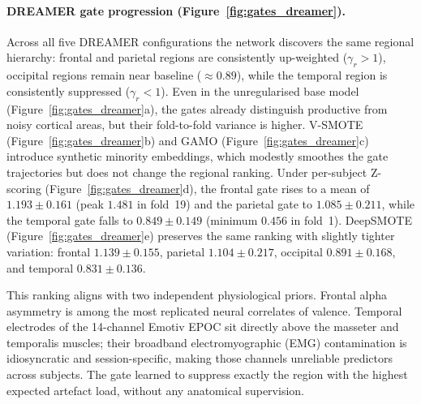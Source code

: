 \documentclass[a4paper,fleqn]{cas-sc}
\begin{document}
\paragraph{DREAMER gate progression (Figure~\ref{fig:gates_dreamer}).}
Across all five DREAMER configurations the network discovers the same regional hierarchy: frontal and parietal regions are consistently up-weighted ($\gamma_r > 1$), occipital regions remain near baseline ($\approx 0.89$), while the temporal region is consistently suppressed ($\gamma_r < 1$). Even in the unregularised base model (Figure~\ref{fig:gates_dreamer}a), the gates already distinguish productive from noisy cortical areas, but their fold-to-fold variance is higher. V-SMOTE (Figure~\ref{fig:gates_dreamer}b) and GAMO (Figure~\ref{fig:gates_dreamer}c) introduce synthetic minority embeddings, which modestly smoothes the gate trajectories but does not change the regional ranking. Under per-subject Z-scoring (Figure~\ref{fig:gates_dreamer}d), the frontal gate rises to a mean of $1.193\pm0.161$ (peak $1.481$ in fold~19) and the parietal gate to $1.085\pm0.211$, while the temporal gate falls to $0.849\pm0.149$ (minimum $0.456$ in fold~1). DeepSMOTE (Figure~\ref{fig:gates_dreamer}e) preserves the same ranking with slightly tighter variation: frontal $1.139\pm0.155$, parietal $1.104\pm0.217$, occipital $0.891\pm0.168$, and temporal $0.831\pm0.136$.

This ranking aligns with two independent physiological priors. Frontal alpha asymmetry is among the most replicated neural correlates of valence. Temporal electrodes of the 14-channel Emotiv EPOC sit directly above the masseter and temporalis muscles; their broadband electromyographic (EMG) contamination is idiosyncratic and session-specific, making those channels unreliable predictors across subjects. The gate learned to suppress exactly the region with the highest expected artefact load, without any anatomical supervision.
\end{document}
